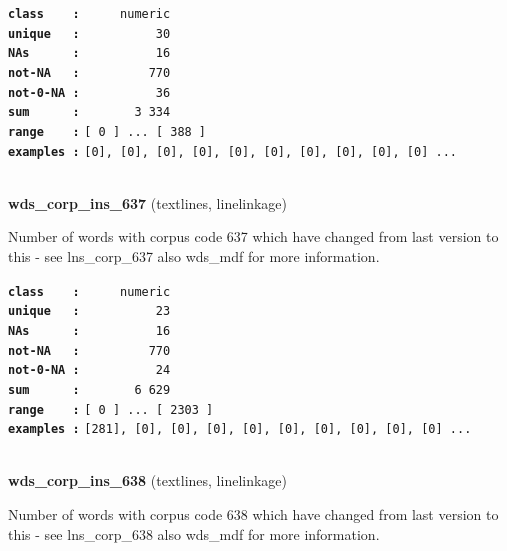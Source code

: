 \documentclass[]{article}
\begin{document}
\textbf{\texttt{class\ \ \ \ :}} \texttt{~~~~~numeric}\\
\textbf{\texttt{unique\ \ \ :}} \texttt{~~~~~~~~~~30}\\
\textbf{\texttt{NAs\ \ \ \ \ \ :}} \texttt{~~~~~~~~~~16}\\
\textbf{\texttt{not-NA\ \ \ :}} \texttt{~~~~~~~~~770}\\
\textbf{\texttt{not-0-NA\ :}} \texttt{~~~~~~~~~~36}\\
\textbf{\texttt{sum\ \ \ \ \ \ :}} \texttt{~~~~~~~3~334}\\
\textbf{\texttt{range\ \ \ \ :}}
\texttt{{[}\ 0\ {]}\ ...\ {[}\ 388\ {]}}\\
\textbf{\texttt{examples\ :}}
\texttt{{[}0{]},\ {[}0{]},\ {[}0{]},\ {[}0{]},\ {[}0{]},\ {[}0{]},\ {[}0{]},\ {[}0{]},\ {[}0{]},\ {[}0{]}\ ...}\\

~

\textbf{wds\_corp\_ins\_637} (textlines, linelinkage)

Number of words with corpus code 637 which have changed from last
version to this - see lns\_corp\_637 also wds\_mdf for more information.

\textbf{\texttt{class\ \ \ \ :}} \texttt{~~~~~numeric}\\
\textbf{\texttt{unique\ \ \ :}} \texttt{~~~~~~~~~~23}\\
\textbf{\texttt{NAs\ \ \ \ \ \ :}} \texttt{~~~~~~~~~~16}\\
\textbf{\texttt{not-NA\ \ \ :}} \texttt{~~~~~~~~~770}\\
\textbf{\texttt{not-0-NA\ :}} \texttt{~~~~~~~~~~24}\\
\textbf{\texttt{sum\ \ \ \ \ \ :}} \texttt{~~~~~~~6~629}\\
\textbf{\texttt{range\ \ \ \ :}}
\texttt{{[}\ 0\ {]}\ ...\ {[}\ 2303\ {]}}\\
\textbf{\texttt{examples\ :}}
\texttt{{[}281{]},\ {[}0{]},\ {[}0{]},\ {[}0{]},\ {[}0{]},\ {[}0{]},\ {[}0{]},\ {[}0{]},\ {[}0{]},\ {[}0{]}\ ...}\\

~

\textbf{wds\_corp\_ins\_638} (textlines, linelinkage)

Number of words with corpus code 638 which have changed from last
version to this - see lns\_corp\_638 also wds\_mdf for more information.
\end{document}
